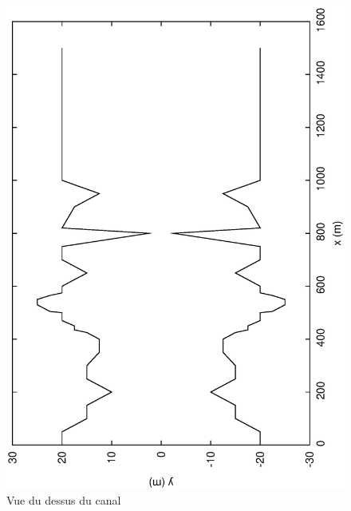 \documentclass[a4paper,10pt]{article}
\begin{document}
\begin{figure}
 \begin{center}
  \includegraphics[angle=270,width=15cm]{canal.eps}
  \caption{Vue du dessus du canal}
  \label{fig2}
 \end{center}
\end{figure}

\newpage
\end{document}
